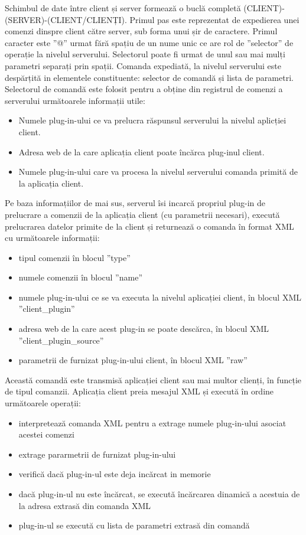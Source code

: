 \par Schimbul de date între client și server formează o buclă completă (CLIENT)-(SERVER)-(CLIENT/CLIENȚI). 
Primul pas este reprezentat de expedierea unei comenzi dinspre client către server, sub forma unui șir de caractere. Primul caracter este ”@” urmat fără spațiu de un nume unic ce are rol de ”selector” de operație la nivelul serverului. Selectorul poate fi urmat de unul sau mai mulți parametri separați prin spații. Comanda expediată, la nivelul serverului este despărțită in elementele constituente: selector de comandă și lista de parametri. Selectorul de comandă este folosit pentru a obține din registrul de comenzi a serverului următoarele informații utile:
\begin{itemize}
\item Numele plug-in-ului ce va prelucra răspunsul serverului la nivelul aplicției client.
\item Adresa web de la care aplicația client poate încărca plug-inul client.
\item Numele plug-in-ului care va procesa la nivelul serverului comanda primită de la aplicația client.
\end{itemize}
Pe baza informațiilor de mai sus, serverul îsi incarcă propriul plug-in de prelucrare a comenzii de la aplicația client (cu parametrii necesari), execută prelucrarea datelor primite de la client și returnează o comanda în format XML cu următoarele informații:

\begin{itemize}
\item tipul comenzii în blocul ”type”
\item numele comenzii în blocul ”name”
\item numele plug-in-ului ce se va executa la nivelul aplicației client, în blocul XML ”client\_plugin”
\item adresa web de la care acest plug-in se poate descărca, în blocul XML ”client\_plugin\_source”
\item parametrii de furnizat plug-in-ului client, în blocul XML ”raw”
\end{itemize}
Această comandă este transmisă aplicației client sau mai multor clienți, în funcție de tipul comanzii. Aplicația client preia mesajul XML și execută în ordine următoarele operații:

\begin{itemize}
\item interpretează comanda XML pentru a extrage numele plug-in-ului asociat acestei comenzi
\item extrage pararmetrii de furnizat plug-in-ului
\item verifică dacă plug-in-ul este deja incărcat in memorie 
\item dacă  plug-in-ul nu este încărcat, se execută încărcarea dinamică a acestuia de la adresa extrasă din comanda XML
\item plug-in-ul se execută cu lista de parametri extrasă din comandă
\end{itemize}

